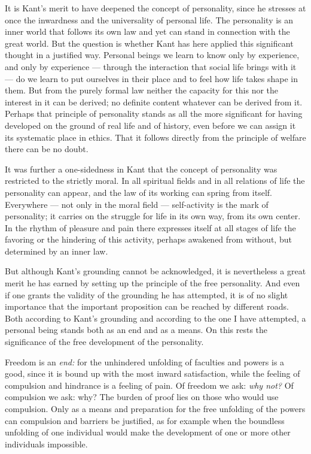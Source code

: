 \documentclass[12pt,a4paper,openany]{book}
\newcommand{\opage}[1]{\marginnote{\footnotesize\textit{[#1]}}}
\begin{document}
It is Kant's merit to have deepened the concept of personality, since he stresses at once the inwardness and
the universality of personal life. The personality is an inner world that follows its own law and yet can
stand in connection with the great world. But the question is whether Kant has here applied this significant
thought in a justified way. Personal beings we learn to know only by experience, and only by experience ---
through the interaction that social life brings with it --- do we learn to put ourselves in their place and to
feel how life takes shape in them. But from the purely formal law neither the capacity for this nor the interest
in it can be derived; no definite content whatever can be derived from it. Perhaps that principle of
personality stands as all the more significant for having developed on the ground of real life and of history,
even before we can assign it its systematic place in ethics. That it follows directly from the principle of
welfare there can be no doubt.

It was further a one-sidedness in Kant that the concept of personality was restricted to the strictly moral.
In all spiritual fields and in all relations of life the personality can appear, and the law of its working can
spring from itself. Everywhere --- not only in the moral field --- self-activity is the mark of personality; it
carries on the struggle for life in its own way, from its own center. In the rhythm of pleasure and pain there
expresses itself at all stages of life the favoring
\opage{176}or the hindering of this activity, perhaps awakened from without, but determined by an inner law.

But although Kant's grounding cannot be acknowledged, it is nevertheless a great merit he has earned by setting
up the principle of the free personality. And even if one grants the validity of the grounding he has
attempted, it is of no slight importance that the important proposition can be reached by different roads. Both
according to Kant's grounding and according to the one I have attempted, a personal being stands both as an
end and as a means. On this rests the significance of the free development of the personality.

Freedom is an \textit{end:} for the unhindered unfolding of faculties and powers is a good, since it is bound up
with the most inward satisfaction, while the feeling of compulsion and hindrance is a feeling of pain. Of
freedom we ask: \textit{why not?} Of compulsion we ask: why? The burden of proof lies on those who would use
compulsion. Only as a means and preparation for the free unfolding of the powers can compulsion and barriers be
justified, as for example when the boundless unfolding of one individual would make the development of one or
more other individuals impossible.
\end{document}
